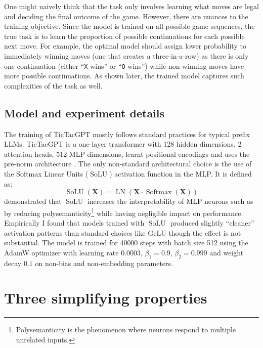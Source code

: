 \documentclass{article}
\newcommand{\ttgpt}{TicTacGPT\xspace}
\newcommand{\m}[1]{\mathbf{\bm{#1}}}
\DeclareMathOperator{\softmax}{Softmax}
\DeclareMathOperator{\solu}{SoLU}
\DeclareMathOperator{\layernorm}{LN}
\begin{document}
One might naively think that the task only involves learning what moves are legal and deciding the final outcome of the game. However, there are nuances to the training objective. Since the model is trained on all possible game sequences, the true task is to learn the proportion of possible continuations for each possible next move. For example, the optimal model should assign lower probability to immediately winning moves (one that creates a three-in-a-row) as there is only one continuation (either ``\texttt{X} wins'' or ``\texttt{O} wins'') while non-winning moves have more possible continuations. As shown later, the trained model captures such complexities of the task as well.

\subsection{Model and experiment details}

The training of \ttgpt mostly follows standard practices \citep{radford2019language} for typical prefix \ac{LLMs}. \ttgpt is a one-layer transformer with 128 hidden dimensions, 2 attention heads, 512 MLP dimensions, learnt positional encodings and uses the pre-norm architecture \citep{xiong2020layer}. The only non-standard architectural choice is the use of the Softmax Linear Units ($\solu$) \citep{elhage2022solu} activation function in the MLP. It is defined as:
\begin{equation*}
    \solu(\m{X}) = \layernorm(\m{X} \cdot \softmax(\m{X}))
\end{equation*}
\citet{elhage2022solu} demonstrated that $\solu$ increases the interpretability of MLP neurons such as by reducing polysemanticity\footnote{Polysemanticity is the phenomenon where neurons respond to multiple unrelated inputs.}\citep{olah2020zoom} while having negligible impact on performance. Empirically I found that models trained with $\solu$ produced slightly ``cleaner'' activation patterns than standard choices like $\text{GeLU}$ though the effect is not substantial. The model is trained for 40000 steps with batch size 512 using the AdamW optimizer \citep{loshchilov2017decoupled} with learning rate $0.0003$, $\beta_1 = 0.9$, $\beta_2 = 0.999$ and weight decay $0.1$ on non-bias and non-embedding parameters.

\section{Three simplifying properties} \label{sec:simplify}
\end{document}
